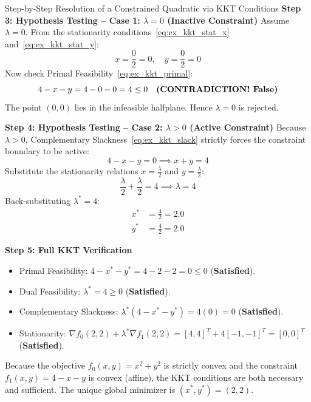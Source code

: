 \begin{examplebox}[breakable]{Step-by-Step Resolution of a Constrained Quadratic via KKT Conditions}
\textbf{Step 3: Hypothesis Testing -- Case 1: $\lambda = 0$ (Inactive Constraint)}
Assume $\lambda = 0$.
From the stationarity conditions~\eqref{eq:ex_kkt_stat_x} and~\eqref{eq:ex_kkt_stat_y}:
\begin{equation}
x = \frac{0}{2} = 0, \quad y = \frac{0}{2} = 0
\end{equation}
Now check Primal Feasibility~\eqref{eq:ex_kkt_primal}:
\begin{equation}
4 - x - y = 4 - 0 - 0 = 4 \le 0 \quad \text{\textbf{(CONTRADICTION! False)}}
\end{equation}
The point $(0, 0)$ lies in the infeasible halfplane. Hence $\lambda = 0$ is rejected.

\textbf{Step 4: Hypothesis Testing -- Case 2: $\lambda > 0$ (Active Constraint)}
Because $\lambda > 0$, Complementary Slackness~\eqref{eq:ex_kkt_slack} strictly forces the constraint boundary to be active:
\begin{equation}
4 - x - y = 0 \implies x + y = 4
\end{equation}
Substitute the stationarity relations $x = \frac{\lambda}{2}$ and $y = \frac{\lambda}{2}$:
\begin{equation}
\frac{\lambda}{2} + \frac{\lambda}{2} = 4 \implies \lambda = 4
\end{equation}
Back-substituting $\lambda^* = 4$:
\begin{align}
x^* &= \frac{4}{2} = 2.0 \\
y^* &= \frac{4}{2} = 2.0
\end{align}

\textbf{Step 5: Full KKT Verification}
\begin{itemize}
    \item Primal Feasibility: $4 - x^* - y^* = 4 - 2 - 2 = 0 \le 0$ (\textbf{Satisfied}).
    \item Dual Feasibility: $\lambda^* = 4 \ge 0$ (\textbf{Satisfied}).
    \item Complementary Slackness: $\lambda^*(4 - x^* - y^*) = 4(0) = 0$ (\textbf{Satisfied}).
    \item Stationarity: $\nabla f_0(2, 2) + \lambda^* \nabla f_1(2, 2) = [4, 4]^T + 4[-1, -1]^T = [0, 0]^T$ (\textbf{Satisfied}).
\end{itemize}
Because the objective $f_0(x, y) = x^2 + y^2$ is strictly convex and the constraint $f_1(x, y) = 4 - x - y$ is convex (affine), the KKT conditions are both necessary and sufficient.
The unique global minimizer is $(x^*, y^*) = (2, 2)$.


\end{examplebox}
